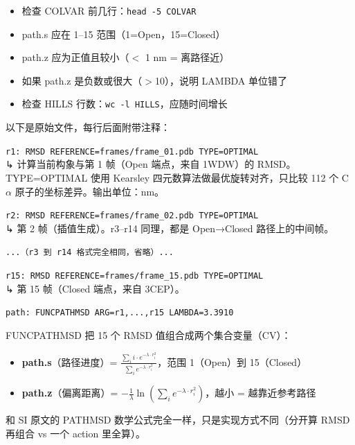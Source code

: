 \documentclass[11pt,a4paper]{article}
\begin{document}
\begin{iobox}[怎么确认文件是对的]
\begin{itemize}[nosep]
\item 检查 COLVAR 前几行：\texttt{head -5 COLVAR}
\item path.s 应在 1--15 范围（1=Open，15=Closed）
\item path.z 应为正值且较小（$<$ 1 nm = 离路径近）
\item 如果 path.z 是负数或很大（$>$10），说明 LAMBDA 单位错了
\item 检查 HILLS 行数：\texttt{wc -l HILLS}，应随时间增长
\end{itemize}
\end{iobox}

\vspace{10pt}
\noindent 以下是原始文件，每行后面附带注释：

\vspace{5pt}

\noindent\texttt{\textcolor{paramcolor}{r1: RMSD REFERENCE=frames/frame\_01.pdb TYPE=OPTIMAL}}\\
\textcolor{notecolor}{↳ 计算当前构象与第 1 帧（Open 端点，来自 1WDW）的 RMSD。TYPE=OPTIMAL 使用 Kearsley 四元数算法做最优旋转对齐，只比较 112 个 C$\alpha$ 原子的坐标差异。输出单位：nm。}

\vspace{3pt}
\noindent\texttt{\textcolor{paramcolor}{r2: RMSD REFERENCE=frames/frame\_02.pdb TYPE=OPTIMAL}}\\
\textcolor{notecolor}{↳ 第 2 帧（插值生成）。r3--r14 同理，都是 Open→Closed 路径上的中间帧。}

\vspace{3pt}
\noindent\texttt{\textcolor{paramcolor}{...（r3 到 r14 格式完全相同，省略）...}}

\vspace{3pt}
\noindent\texttt{\textcolor{paramcolor}{r15: RMSD REFERENCE=frames/frame\_15.pdb TYPE=OPTIMAL}}\\
\textcolor{notecolor}{↳ 第 15 帧（Closed 端点，来自 3CEP）。}

\vspace{8pt}

\noindent\texttt{\textcolor{paramcolor}{path: FUNCPATHMSD ARG=r1,...,r15 LAMBDA=3.3910}}

\begin{notebox}
FUNCPATHMSD 把 15 个 RMSD 值组合成两个集合变量（CV）：
\begin{itemize}[nosep]
\item \textbf{path.s}（路径进度）= $\frac{\sum_i i \cdot e^{-\lambda \cdot r_i^2}}{\sum_i e^{-\lambda \cdot r_i^2}}$，范围 1（Open）到 15（Closed）
\item \textbf{path.z}（偏离距离）= $-\frac{1}{\lambda} \ln\left(\sum_i e^{-\lambda \cdot r_i^2}\right)$，越小 = 越靠近参考路径
\end{itemize}
和 SI 原文的 PATHMSD 数学公式完全一样，只是实现方式不同（分开算 RMSD 再组合 vs 一个 action 里全算）。
\end{notebox}
\end{document}
